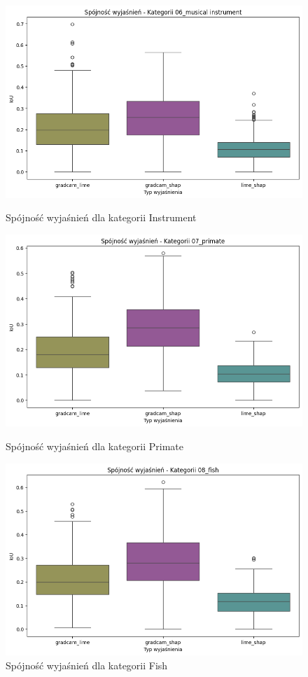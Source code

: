 \begin{figure}
	\centering
	\begin{minipage}[b]{0.3\textwidth}
		\centering\includegraphics[width=.9\textwidth]{img/base_coherence_music}
		\caption{Spójność wyjaśnień dla kategorii Instrument}  \label{}
	\end{minipage}
	\begin{minipage}[b]{0.3\textwidth}
		\centering\includegraphics[width=.9\textwidth]{img/base_coherence_primate}
		\caption{Spójność wyjaśnień dla kategorii Primate}  \label{}
	\end{minipage}
	\begin{minipage}[b]{0.3\textwidth}
		\centering\includegraphics[width=.9\textwidth]{img/base_coherence_fish}
		\caption{Spójność wyjaśnień dla kategorii Fish}  \label{}
	\end{minipage}
\end{figure}

